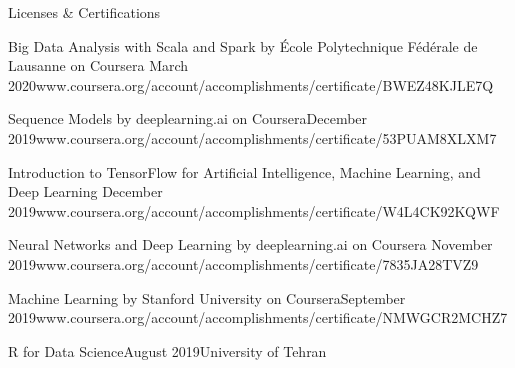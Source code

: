 \documentclass{cv_yazdan} %
\begin{document}
\begin{rSection}{Licenses & Certifications}

\begin{rSubsection}{Big Data Analysis with Scala and Spark by École Polytechnique Fédérale de Lausanne on Coursera }{ March 2020}{www.coursera.org/account/accomplishments/certificate/BWEZ48KJLE7Q}

\end{rSubsection}


\begin{rSubsection}{Sequence Models by deeplearning.ai on Coursera}{December 2019}{www.coursera.org/account/accomplishments/certificate/53PUAM8XLXM7}

\end{rSubsection}


\begin{rSubsection}{Introduction to TensorFlow for Artificial Intelligence, Machine Learning, and Deep Learning }{December 2019}{www.coursera.org/account/accomplishments/certificate/W4L4CK92KQWF}

\end{rSubsection}


\begin{rSubsection}{Neural Networks and Deep Learning by deeplearning.ai on Coursera }{November 2019}{www.coursera.org/account/accomplishments/certificate/7835JA28TVZ9}

\end{rSubsection}





\begin{rSubsection}{Machine Learning by Stanford University on Coursera}{September 2019}{www.coursera.org/account/accomplishments/certificate/NMWGCR2MCHZ7}

\end{rSubsection}

\begin{rSubsection}{R for Data Science}{August 2019}{University of Tehran}

\end{rSubsection}

\end{rSection}

\end{document}
